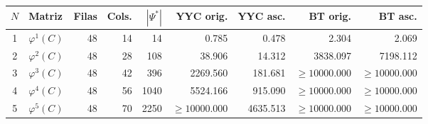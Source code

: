 \begin{tabular}{@{}clrrr|rrrr@{}}
\toprule
$N$ & Matriz & Filas & Cols. & $|\Psi^*|$ & YYC orig. & YYC asc. & BT orig. & BT asc. \\
\midrule
1 & $\varphi^{1}(C)$ & 48 & 14 & 14 & 0.785 & 0.478 & 2.304 & 2.069 \\
2 & $\varphi^{2}(C)$ & 48 & 28 & 108 & 38.906 & 14.312 & 3838.097 & 7198.112 \\
3 & $\varphi^{3}(C)$ & 48 & 42 & 396 & 2269.560 & 181.681 & $\ge 10000.000$ & $\ge 10000.000$ \\
4 & $\varphi^{4}(C)$ & 48 & 56 & 1040 & 5524.166 & 915.090 & $\ge 10000.000$ & $\ge 10000.000$ \\
5 & $\varphi^{5}(C)$ & 48 & 70 & 2250 & $\ge 10000.000$ & 4635.513 & $\ge 10000.000$ & $\ge 10000.000$ \\
\bottomrule
\end{tabular}
